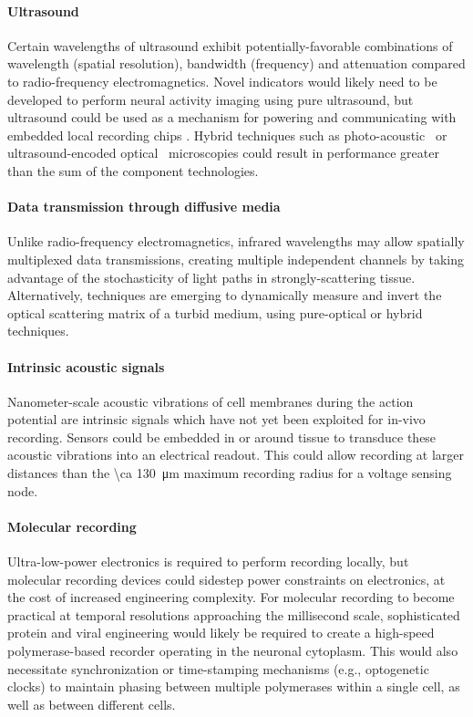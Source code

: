 \paragraph{Ultrasound} Certain wavelengths of ultrasound exhibit potentially-favorable combinations of wavelength (spatial resolution), bandwidth (frequency) and attenuation compared to radio-frequency electromagnetics. Novel indicators \cite{ShapiroGasNanostructures} would likely need to be developed to perform neural activity imaging using pure ultrasound, but ultrasound could be used as a mechanism for powering and communicating with embedded local recording chips \cite{Seo2013}. Hybrid techniques such as photo-acoustic~\cite{filonov12} or ultrasound-encoded optical~\cite{wang12} microscopies could result in performance greater than the sum of the component technologies.

\paragraph{Data transmission through diffusive media} Unlike radio-frequency electromagnetics, infrared wavelengths may allow spatially multiplexed data transmissions, creating multiple independent channels by taking advantage of the stochasticity of light paths in strongly-scattering tissue. Alternatively, techniques are emerging to dynamically measure and invert the optical scattering matrix of a turbid medium, using pure-optical or hybrid techniques.

\paragraph{Intrinsic acoustic signals} Nanometer-scale acoustic vibrations of cell membranes during the action potential are intrinsic signals which have not yet been exploited for in-vivo recording. Sensors could be embedded in or around tissue to transduce these acoustic vibrations into an electrical readout. This could allow recording at larger distances than the \SI{\ca 130}{\micro\meter} maximum recording radius for a voltage sensing node.

\paragraph{Molecular recording} Ultra-low-power electronics is required to perform recording locally, but molecular recording devices could sidestep power constraints on electronics, at the cost of increased engineering complexity. For molecular recording to become practical at temporal resolutions approaching the millisecond scale, sophisticated protein and viral engineering would likely be required to create a high-speed polymerase-based recorder operating in the neuronal cytoplasm. This would also necessitate synchronization or time-stamping mechanisms (e.g., optogenetic clocks) to maintain phasing between multiple polymerases within a single cell, as well as between different cells. 

